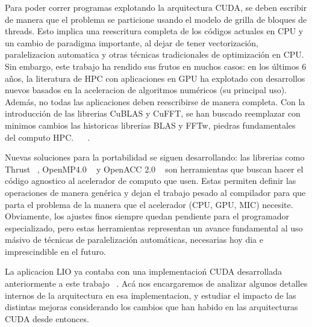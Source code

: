 Para poder correr programas explotando la arquitectura CUDA, se deben escribir de manera que
el problema se particione usando el modelo de grilla de bloques de threads. Esto implica una
reescritura completa de los c\'odigos actuales en CPU y un cambio de paradigma importante, al
dejar de tener vectorizaci\'on, paralelizacion automatica y otras t\'ecnicas tradicionales
de optimizaci\'on en CPU. Sin embargo, este trabajo ha rendido sus frutos en muchos casos:
en los \'ultimos 6 a\~nos, la literatura de HPC con aplicaciones en GPU ha explotado con
desarrollos nuevos basados en la aceleracion de algoritmos num\'ericos (su principal uso).
Adem\'as, no todas las aplicaciones deben reescribirse de manera completa. Con la introducci\'on
de las librerias CuBLAS y CuFFT, se han buscado reemplazar con minimos cambios las historicas
librerias BLAS y FFTw, piedras fundamentales del computo HPC. ~\cite{cublas} ~\cite{cufft}.

Nuevas soluciones para la portabilidad se siguen desarrollando: las librerias como Thrust ~\cite{thrust},
OpenMP4.0 ~\cite{OpenMPspec} y OpenACC 2.0 ~\cite{OpenACCSpec} son herramientas que buscan hacer el
c\'odigo agnostico al acelerador de computo que usen. Estas permiten definir las operaciones de
manera gen\'erica y dejan el trabajo pesado al compilador para que parta el problema de la manera
que el acelerador (CPU, GPU, MIC) necesite. Obviamente, los ajustes finos siempre quedan pendiente para
el programador especializado, pero estas herramientas representan un avance fundamental al uso
m\'asivo de t\'ecnicas de paralelizaci\'on autom\'aticas, necesarias hoy dia e imprescindible en el
futuro.

La aplicacion LIO ya contaba con una implementacio\'n CUDA desarrollada anteriormente a este
trabajo ~\cite{TesisNitsche}. Ac\'a nos encargaremos de analizar algunos detalles internos de
la arquitectura en esa implementacion, y estudiar el impacto de las distintas mejoras considerando
los cambios que han habido en las arquitecturas CUDA desde entonces.
